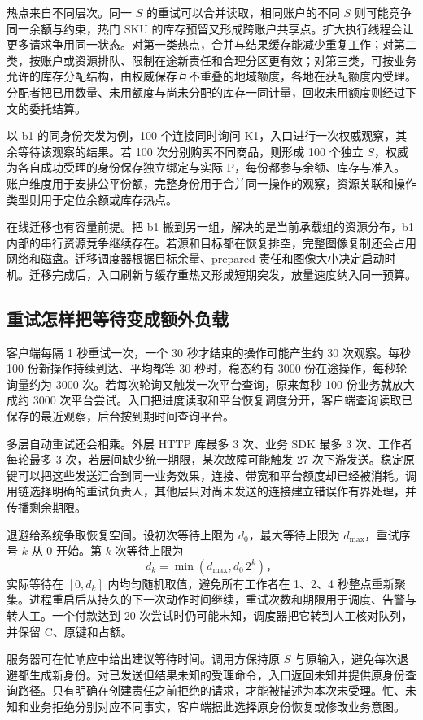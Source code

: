 热点来自不同层次。同一 $S$ 的重试可以合并读取，相同账户的不同 $S$ 则可能竞争同一余额与约束，热门 SKU 的库存预留又形成跨账户共享点。扩大执行线程会让更多请求争用同一状态。对第一类热点，合并与结果缓存能减少重复工作；对第二类，按账户或资源排队、限制在途新责任和合理分区更有效；对第三类，可按业务允许的库存分配结构，由权威保存互不重叠的地域额度，各地在获配额度内受理。分配者把已用数量、未用额度与尚未分配的库存一同计量，回收未用额度则经过下文的委托结算。

以 b1 的同身份突发为例，100 个连接同时询问 K1，入口进行一次权威观察，其余等待该观察的结果。若 100 次分别购买不同商品，则形成 100 个独立 $S$，权威为各自成功受理的身份保存独立绑定与实际 P，每份都参与余额、库存与准入。账户维度用于安排公平份额，完整身份用于合并同一操作的观察，资源关联和操作类型则用于定位余额或库存热点。

在线迁移也有容量前提。把 b1 搬到另一组，解决的是当前承载组的资源分布，b1 内部的串行资源竞争继续存在。若源和目标都在恢复排空，完整图像复制还会占用网络和磁盘。迁移调度器根据目标余量、prepared 责任和图像大小决定启动时机。迁移完成后，入口刷新与缓存重热又形成短期突发，放量速度纳入同一预算。

\subsection{重试怎样把等待变成额外负载}

客户端每隔 1 秒重试一次，一个 30 秒才结束的操作可能产生约 30 次观察。每秒 100 份新操作持续到达、平均都等 30 秒时，稳态约有 3000 份在途操作，每秒轮询量约为 3000 次。若每次轮询又触发一次平台查询，原来每秒 100 份业务就放大成约 3000 次平台尝试。入口把进度读取和平台恢复调度分开，客户端查询读取已保存的最近观察，后台按到期时间查询平台。

多层自动重试还会相乘。外层 HTTP 库最多 3 次、业务 SDK 最多 3 次、工作者每轮最多 3 次，若层间缺少统一期限，某次故障可能触发 27 次下游发送。稳定原键可以把这些发送汇合到同一业务效果，连接、带宽和平台额度却已经被消耗。调用链选择明确的重试负责人，其他层只对尚未发送的连接建立错误作有界处理，并传播剩余期限。

退避给系统争取恢复空间。设初次等待上限为 $d_0$，最大等待上限为 $d_{\max}$，重试序号 $k$ 从 0 开始。第 $k$ 次等待上限为
\[
d_k=\min(d_{\max},d_0\,2^k)\text{，}
\]
实际等待在 $[0,d_k]$ 内均匀随机取值，避免所有工作者在 1、2、4 秒整点重新聚集。进程重启后从持久的下一次动作时间继续，重试次数和期限用于调度、告警与转人工。一个付款达到 20 次尝试时仍可能未知，调度器把它转到人工核对队列，并保留 C、原键和占额。

服务器可在忙响应中给出建议等待时间。调用方保持原 $S$ 与原输入，避免每次退避都生成新身份。对已发送但结果未知的受理命令，入口返回未知并提供原身份查询路径。只有明确在创建责任之前拒绝的请求，才能被描述为本次未受理。忙、未知和业务拒绝分别对应不同事实，客户端据此选择原身份恢复或修改业务意图。

